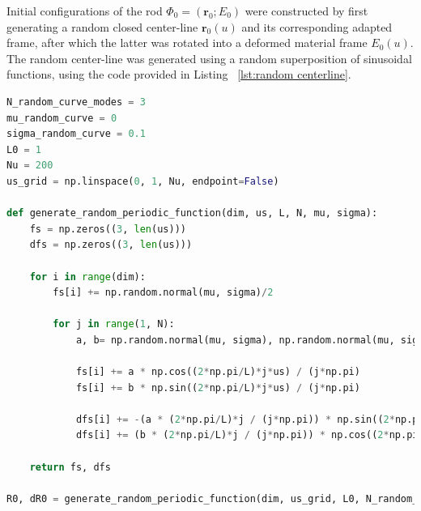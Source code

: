 \documentclass[]{cam-thesis}
\begin{document}
Initial configurations of the rod $\Phi_0 = (\mathbf{r}_0 ; E_0)$ were constructed by first generating a random closed center-line $\mathbf{r}_0(u)$ and its corresponding adapted frame, after which the latter was rotated into a deformed material frame $E_0(u)$. The random center-line was generated using a random superposition of sinusoidal functions, using the code provided in Listing ~\ref{lst:random centerline}.

\begin{lstlisting}[language=Python, caption=Generating random stiffness matrices and moment of inertia., label={lst:random centerline}]
N_random_curve_modes = 3
mu_random_curve = 0
sigma_random_curve = 0.1
L0 = 1
Nu = 200
us_grid = np.linspace(0, 1, Nu, endpoint=False)

def generate_random_periodic_function(dim, us, L, N, mu, sigma):
    fs = np.zeros((3, len(us)))
    dfs = np.zeros((3, len(us)))
    
    for i in range(dim):
        fs[i] += np.random.normal(mu, sigma)/2
        
        for j in range(1, N):
            a, b= np.random.normal(mu, sigma), np.random.normal(mu, sigma)
            
            fs[i] += a * np.cos((2*np.pi/L)*j*us) / (j*np.pi)
            fs[i] += b * np.sin((2*np.pi/L)*j*us) / (j*np.pi)
            
            dfs[i] += -(a * (2*np.pi/L)*j / (j*np.pi)) * np.sin((2*np.pi/L)*j*us)
            dfs[i] += (b * (2*np.pi/L)*j / (j*np.pi)) * np.cos((2*np.pi/L)*j*us)
            
    return fs, dfs

R0, dR0 = generate_random_periodic_function(dim, us_grid, L0, N_random_curve_modes, mu_random_curve, sigma_random_curve)
\end{lstlisting}
\end{document}
